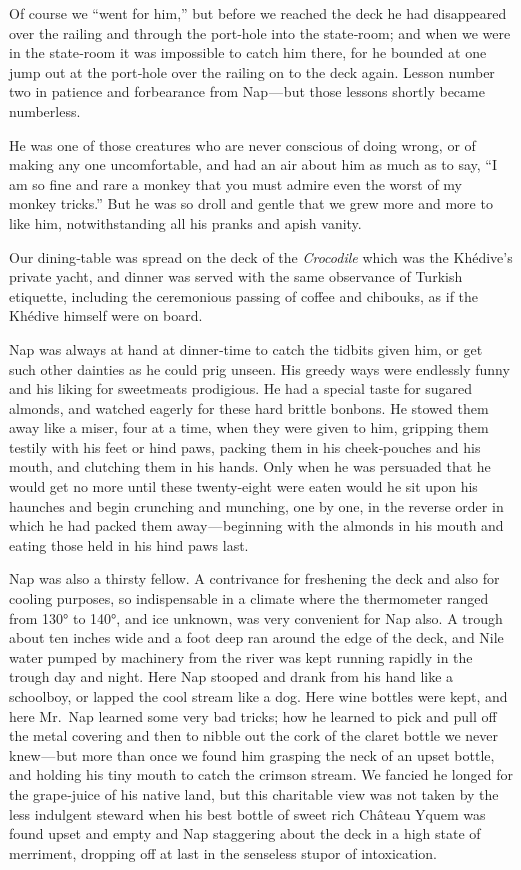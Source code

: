 \documentclass[12pt]{book}
\begin{document}
Of course we “went for him,” but before we reached the deck he had disappeared over the railing and through the port‐hole into the state‐room; and when
we were in the state‐room it was impossible to catch him there, for he bounded
at one jump out at the port‐hole over the railing on to the deck again. Lesson
number two in patience and forbearance from Nap — but those lessons shortly
became numberless.

He was one of those creatures who are never conscious of doing wrong, or of
making any one uncomfortable, and had an air about him as much as to say, “I am
so fine and rare a monkey that you must admire even the worst of my monkey
tricks.” But he was so droll and gentle that we grew more and more to like him,
notwithstanding all his pranks and apish vanity.

Our dining‐table was spread on the deck of the {\it Crocodile} which was the
Khédive’s private yacht, and dinner was served with the same observance of
Turkish etiquette, including the ceremonious passing of coffee and chibouks, as if
the Khédive himself were on board.

Nap was always at hand at dinner‐time to catch the tidbits given him, or get
such other dainties as he could prig unseen. His greedy ways were endlessly
funny and his liking for sweetmeats prodigious. He had a special taste for sugared
almonds, and watched eagerly for these hard brittle bonbons. He stowed them
away like a miser, four at a time, when they were given to him, gripping them
testily with his feet or hind paws, packing them in his cheek‐pouches and his
mouth, and clutching them in his hands. Only when he was persuaded that he
would get no more until these twenty‐eight were eaten would he sit upon his
haunches and begin crunching and munching, one by one, in the reverse order in
which he had packed them away — beginning with the almonds in his mouth and
eating those held in his hind paws last.

Nap was also a thirsty fellow. A contrivance for freshening the deck and
also for cooling purposes, so indispensable in a climate where the thermometer
ranged from 130° to 140°, and ice unknown, was very convenient for Nap also. A
trough about ten inches wide and a foot deep ran around the edge of the deck,
and Nile water pumped by machinery from the river was kept running rapidly
in the trough day and night. Here Nap stooped and drank from his hand like a
schoolboy, or lapped the cool stream like a dog. Here wine bottles were kept, and
here Mr.~Nap learned some very bad tricks; how he learned to pick and pull off
the metal covering and then to nibble out the cork of the claret bottle we never
knew — but more than once we found him grasping the neck of an upset bottle,
and holding his tiny mouth to catch the crimson stream. We fancied he longed
for the grape‐juice of his native land, but this charitable view was not taken by
the less indulgent steward when his best bottle of sweet rich Château Yquem
was found upset and empty and Nap staggering about the deck in a high state of
merriment, dropping off at last in the senseless stupor of intoxication.
\end{document}
